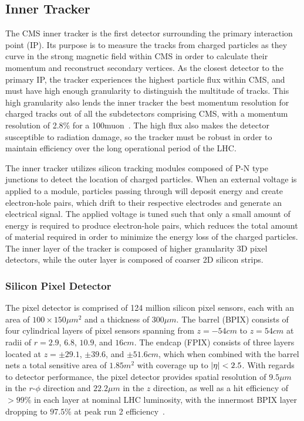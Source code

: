 \subsection{Inner Tracker} \label{sec:CMS_tracker}
The CMS inner tracker is the first detector surrounding the primary interaction point (IP). Its purpose is to measure the tracks from charged particles as they curve in the strong magnetic field within CMS in order to calculate their momentum and reconstruct secondary vertices. As the closest detector to the primary IP, the tracker experiences the highest particle flux within CMS, and must have high enough granularity to distinguish the multitude of tracks. This high granularity also lends the inner tracker the best momentum resolution for charged tracks out of all the subdetectors comprising CMS, with a momentum resolution of 2.8\% for a 100\GeV muon~\cite{The_CMS_Collaboration_2014}. The high flux also makes the detector susceptible to radiation damage, so the tracker must be robust in order to maintain efficiency over the long operational period of the LHC. 

The inner tracker utilizes silicon tracking modules composed of P-N type junctions to detect the location of charged particles. When an external voltage is applied to a module, particles passing through will deposit energy and create electron-hole pairs, which drift to their respective electrodes and generate an electrical signal. The applied voltage is tuned such that only a small amount of energy is required to produce electron-hole pairs, which reduces the total amount of material required in order to minimize the energy loss of the charged particles. The inner layer of the tracker is composed of higher granularity 3D pixel detectors, while the outer layer is composed of coarser 2D silicon strips.

\subsubsection{Silicon Pixel Detector} \label{sec:CMS_pixel}
The pixel detector is comprised of 124 million silicon pixel sensors, each with an area of $100\times150\unit{\mu m^2}$ and a thickness of $300\unit{\mu m}$. The barrel (BPIX) consists of four cylindrical layers of pixel sensors spanning from $z=-54\unit{cm}$ to $z=54\unit{cm}$ at radii of $r=2.9$, $6.8$, $10.9$, and $16\unit{cm}$. The endcap (FPIX) consists of three layers located at $z=\pm29.1$, $\pm39.6$, and $\pm51.6\unit{cm}$, which when combined with the barrel nets a total sensitive area of $1.85\unit{m^2}$ with coverage up to $\abs{\eta}<2.5$. With regards to detector performance, the pixel detector provides spatial resolution of $9.5 \unit{\mu m}$ in the $r$-$\phi$ direction and $22.2 \unit{\mu m}$ in the $z$ direction, as well as a hit efficiency of $>99\%$ in each layer at nominal LHC luminosity, with the innermost BPIX layer dropping to $97.5\%$ at peak run 2 efficiency~\cite{CMSPixelP1}.

